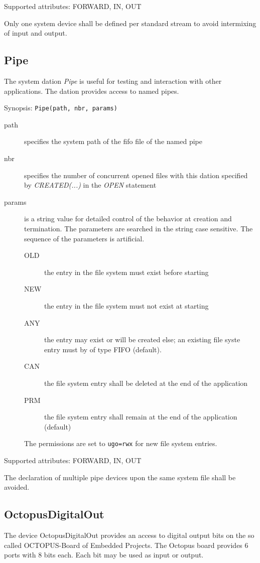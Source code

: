Supported attributes: FORWARD, IN, OUT

Only one system device shall be defined per standard stream to avoid
intermixing of input and output.

\subsection{Pipe}
The system dation {\em Pipe} is useful for testing and interaction with
other applications. The dation provides access to named pipes.

Synopsis: \verb|Pipe(path, nbr, params)|

\begin{description}
\item [path] specifies the system path of the fifo file
    of the named pipe
\item[nbr] specifies the number of concurrent opened files with this dation
     specified by {\em CREATED(...)} in the {\em OPEN} statement
\item [params] is a string value for detailed control of the behavior
     at creation and termination. The parameters are searched in the string
     case sensitive. The sequence of the parameters is artificial.
   \begin{description}
     \item[OLD] the entry in the file system must exist before starting
     \item[NEW] the entry in the file system must not exist at starting
     \item[ANY] the entry may exist or will be created else; an existing
                file syste entry must by of type FIFO (default).
     \item[CAN] the file system entry shall be deleted at the end of the 
                application
     \item[PRM] the file system entry shall remain at the end of the
                application (default)
   \end{description} 
   The permissions are set to \verb|ugo=rwx| for new file system entries.
\end{description}

Supported attributes: FORWARD, IN, OUT

The declaration of multiple pipe devices upon the same system file shall
be avoided.
 
\subsection{OctopusDigitalOut}
The device OctopusDigitalOut provides an access to digital output bits
on the so called OCTOPUS-Board of Embedded Projects.
The Octopus board provides 6 ports with 8 bits each. Each bit may be
used as input or output.

